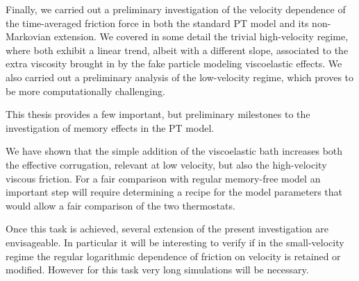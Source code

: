 Finally, we carried out a preliminary investigation of the velocity dependence of the time-averaged friction force in both the standard PT model and its non-Markovian extension. We covered in some detail the trivial high-velocity regime, where both exhibit a linear trend, albeit with a different slope, associated to the extra viscosity brought in by the fake particle modeling viscoelastic effects. We also carried out a preliminary analysis of the low-velocity regime, which proves to be more computationally challenging.

This thesis provides a few important, but preliminary milestones to the investigation of memory effects in the PT model.

We have shown that the simple addition of the viscoelastic bath increases both the effective corrugation, relevant at low velocity, but also the high-velocity viscous friction. For a fair comparison with regular memory-free model an important step will require determining a recipe for the model parameters that would allow a fair comparison of the two thermostats. 

Once this task is achieved, several extension of the present investigation are envisageable. In particular it will be interesting to verify if in the small-velocity regime the regular logarithmic dependence of friction on velocity is retained or modified. However for this task very long simulations will be necessary.
